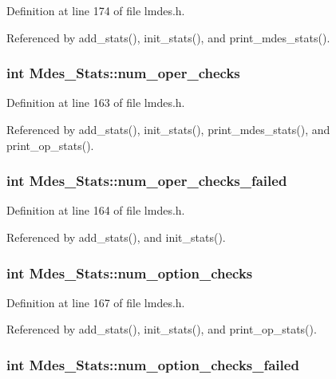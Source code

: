 Definition at line 174 of file lmdes.h.

Referenced by add\_\-stats(), init\_\-stats(), and print\_\-mdes\_\-stats().
\subsubsection{\setlength{\rightskip}{0pt plus 5cm}int \bf{Mdes\_\-Stats::num\_\-oper\_\-checks}}\label{structMdes__Stats_3a0209c939f35e700729639cca5c4930}




Definition at line 163 of file lmdes.h.

Referenced by add\_\-stats(), init\_\-stats(), print\_\-mdes\_\-stats(), and print\_\-op\_\-stats().
\subsubsection{\setlength{\rightskip}{0pt plus 5cm}int \bf{Mdes\_\-Stats::num\_\-oper\_\-checks\_\-failed}}\label{structMdes__Stats_ed64192023276bc96dbad048f6553aeb}




Definition at line 164 of file lmdes.h.

Referenced by add\_\-stats(), and init\_\-stats().
\subsubsection{\setlength{\rightskip}{0pt plus 5cm}int \bf{Mdes\_\-Stats::num\_\-option\_\-checks}}\label{structMdes__Stats_a98ef74cf03c8dc240200a1aecc39866}




Definition at line 167 of file lmdes.h.

Referenced by add\_\-stats(), init\_\-stats(), and print\_\-op\_\-stats().
\subsubsection{\setlength{\rightskip}{0pt plus 5cm}int \bf{Mdes\_\-Stats::num\_\-option\_\-checks\_\-failed}}\label{structMdes__Stats_a5970edae9411728c070573eafff519c}




